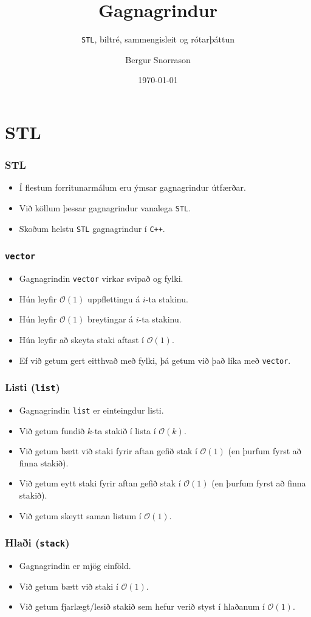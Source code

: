 \documentclass[handout]{beamer}
\title{Gagnagrindur}
\subtitle{\texttt{STL}, biltré, sammengisleit og rótarþáttun}
\author{Bergur Snorrason}
\date{\today}
\begin{document}
\frame{\titlepage}

\section[STL]{STL}

\begin{frame}
\frametitle{STL}
\begin{itemize}
	\item<1-> Í flestum forritunarmálum eru ýmsar gagnagrindur útfærðar.
	\item<2-> Við köllum þessar gagnagrindur vanalega \texttt{STL}.
	\item<3-> Skoðum helstu \texttt{STL} gagnagrindur í \texttt{C++}.
\end{itemize}
\end{frame}

\begin{frame}
\frametitle{\texttt{vector}}
\begin{itemize}
	\item Gagnagrindin \texttt{vector} virkar svipað og fylki.
	\item Hún leyfir $\mathcal{O}(1)$ uppflettingu á $i$-ta stakinu.
	\item Hún leyfir $\mathcal{O}(1)$ breytingar á $i$-ta stakinu.
	\item Hún leyfir að skeyta staki aftast í $\mathcal{O}(1)$.
	\item Ef við getum gert eitthvað með fylki, þá getum við það líka með \texttt{vector}.
\end{itemize}
\end{frame}

\begin{frame}
\frametitle{Listi (\texttt{list})}
\begin{itemize}
	\item Gagnagrindin \texttt{list} er einteingdur listi.
	\item Við getum fundið $k$-ta stakið í lista í $\mathcal{O}(k)$.
	\item Við getum bætt við staki fyrir aftan gefið stak í $\mathcal{O}(1)$ (en þurfum fyrst að finna stakið).
	\item Við getum eytt staki fyrir aftan gefið stak í $\mathcal{O}(1)$ (en þurfum fyrst að finna stakið).
	\item Við getum skeytt saman listum í $\mathcal{O}(1)$.
\end{itemize}
\end{frame}

\begin{frame}
\frametitle{Hlaði (\texttt{stack})}
\begin{itemize}
	\item Gagnagrindin er mjög einföld.
	\item Við getum bætt við staki í $\mathcal{O}(1)$.
	\item Við getum fjarlægt/lesið stakið sem hefur verið styst í hlaðanum í $\mathcal{O}(1)$.
\end{itemize}
\end{frame}
\end{document}

